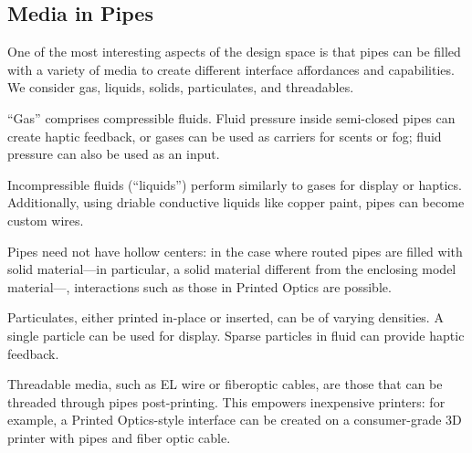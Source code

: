 \subsection{Media in Pipes}
One of the most interesting aspects of the design space is that pipes can be filled with a variety of media to create different interface affordances and capabilities. We consider gas, liquids, solids, particulates, and threadables.

``Gas'' comprises compressible fluids.  Fluid pressure inside semi-closed pipes can create haptic feedback, or gases can be used as carriers for scents or fog; fluid pressure can also be used as an input.

Incompressible fluids (``liquids'') perform similarly to gases for display or haptics.  Additionally, using driable conductive liquids like copper paint, pipes can become custom wires.

Pipes need not have hollow centers: in the case where routed pipes are filled with solid material---in particular, a solid material different from the enclosing model material---, interactions such as those in Printed Optics \cite{Willis-printedoptics} are possible.

Particulates, either printed in-place or inserted, can be of varying densities.  A single particle can be used for display.  Sparse particles in fluid can provide haptic feedback.

Threadable media, such as EL wire or fiberoptic cables, are those that can be threaded through pipes post-printing.  This empowers inexpensive printers: for example, a Printed Optics-style interface can be created on a consumer-grade 3D printer with pipes and fiber optic cable.